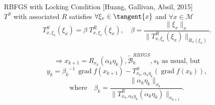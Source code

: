 \documentclass[9pt]{beamer}
\begin{document}
\begin{frame}{RBFGS with Locking Condition}
    \vspace{-1\baselineskip}\hfill{\tiny{[Huang, Gallivan, Absil, 2015]}} \\
    $T^S$ with associated $R$ satisfies $\forall \xi_x \in \tangent{x}$ and $\forall x \in \mathcal{M}$
    \begin{equation*}
        T^{S}_{x, \xi_x}(\xi_x) = \beta \; T^{R}_{x, \xi_x}(\xi_x), \quad \beta = \frac{\lVert \xi_x \rVert_x}{\lVert T^{R}_{x, \xi_x}(\xi_x) \rVert_{R_{x}(\xi_x)}}.
    \end{equation*} \\[0.3\baselineskip]
    \begin{equation*}
        \Rightarrow x_{k+1} = R_{x_k}(\alpha_k \eta_k), \widetilde{\mathcal{B}}^{RBFGS}_k, s_k \text{ as usual, but}
    \end{equation*}
    \begin{equation*}
        y_k = {\beta_k}^{-1} \, \operatorname{grad} f(x_{k+1}) - T^{S}_{x_k, \alpha_k \eta_k}(\operatorname{grad} f(x_k)),
    \end{equation*}
    \begin{equation*}
        \text{where} \quad \beta_k = \frac{\lVert \alpha_k \eta_k \rVert_{x_k}}{\lVert T^{R}_{x_k, \alpha_k \eta_k}(\alpha_k \eta_k) \rVert_{x_{k+1}}}.
    \end{equation*}
\end{frame}
\end{document}
